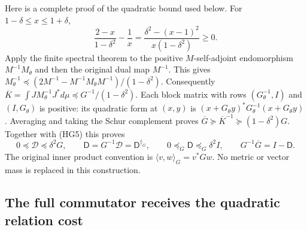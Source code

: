 Here is a complete proof of the quadratic bound used below. For
$1-\delta\le x\le1+\delta$,
\[
 \frac{2-x}{1-\delta^2}-\frac1x
 =\frac{\delta^2-(x-1)^2}{x(1-\delta^2)}\ge0 .
 \tag{HG6}
\]
Apply the finite spectral theorem to the positive $M$-self-adjoint
endomorphism $M^{-1}M_\theta$ and then the original dual map $M^{-1}$.
This gives
$M_\theta^{-1}\preceq
(2M^{-1}-M^{-1}M_\theta M^{-1})/(1-\delta^2)$.
Consequently $\overline K=\int JM_\theta^{-1}J^*d\mu
\preceq G^{-1}/(1-\delta^2)$.
Each block matrix with rows $(G_\theta^{-1},I)$ and $(I,G_\theta)$
is positive: its quadratic form at $(x,y)$ is
$(x+G_\theta y)^*G_\theta^{-1}(x+G_\theta y)$.
Averaging and taking the Schur complement proves
$\overline G\succeq\overline K^{-1}\succeq(1-\delta^2)G$.
Together with (HG5) this proves
\[
 0\preceq\mathscr D\preceq\delta^2G,\qquad
 \mathsf D=G^{-1}\mathscr D=\mathsf D^{\dagger_G},\qquad
 0\preceq_G\mathsf D\preceq_G\delta^2I,\qquad
 G^{-1}\overline G=I-\mathsf D .
 \tag{HG7}
\]
The original inner product convention is $\langle v,w\rangle_G=v^*Gw$.
No metric or vector mass is replaced in this construction.

\subsection{The full commutator receives the quadratic relation cost}

